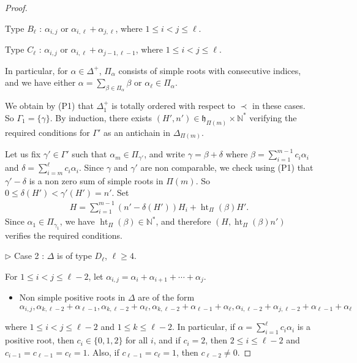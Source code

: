 \documentclass{amsart}
\theoremstyle{definition}
\theoremstyle{remark}
\numberwithin{equation}{section}
\newcommand{\height}{\mathop{\mathrm{ht}}\nolimits}
\begin{document}
\begin{proof}
\begin{itemize}
Type $B_{\ell}$ : $\alpha_{i,j}$ or $\alpha_{i,\ell} + \alpha_{j,\ell}$, where 
$1 \leqslant i < j \leqslant \ell$.

Type $C_{\ell}$ : $\alpha_{i,j}$ or $\alpha_{i,\ell} + \alpha_{j-1,\ell-1}$,
where $1 \leqslant i < j \leqslant \ell$.

\noindent In particular, for $\alpha\in\Delta^{+}$, $\Pi_{\alpha}$ consists of simple roots with 
consecutive indices, and we have either
$\alpha = \sum_{\beta\in \Pi_{\alpha}} \beta$ or 
$\alpha_{\ell} \in \Pi_{\alpha}$.
\end{itemize}

We obtain by (P1) that $\Delta_{1}^{+}$ is totally ordered with respect to $\prec$ in these cases.
So $\Gamma_{1} = \{ \gamma \}$. 
By induction, there exists $( H' , n' ) \in\mathfrak{h}_{\Pi (m)} \times \mathbb{N}^{*}$ 
verifying the required conditions for $\Gamma'$ as an antichain in $\Delta_{\Pi (m) }$.

Let us fix $\gamma'\in \Gamma'$ such that $\alpha_{m}\in\Pi_{\gamma'}$, and
write $\gamma = \beta + \delta$ where 
$\beta = \sum_{i=1}^{m-1} c_{i}\alpha_{i}$ and 
$\delta = \sum_{i=m}^{\ell} c_{i}\alpha_{i}$.
Since $\gamma$ and $\gamma'$ are non comparable, we check using (P1)
that $\gamma' - \delta$ is a non zero sum of simple roots in $\Pi (m)$. So
$0 \leqslant  \delta (H')  < \gamma'  (H') = n'$. 
Set 
$$\begin{array}{c}
H = \sum\limits_{i=1}^{m-1} (n' - \delta( H') ) H_{i} + \height_{\Pi} (\beta) H'.
\end{array}$$
Since $\alpha_{1}\in \Pi_{\gamma_{1}}$, we have $\height_{\Pi} (\beta ) \in \mathbb{N}^{*}$,
and therefore $(H , \height_{\Pi}(\beta ) n' )$ verifies the required conditions.
\smallskip

\noindent$\triangleright$ Case 2 : $\Delta$ is of type $D_{\ell}$, $\ell \geqslant 4$.
\smallskip

For $1\leqslant i < j \leqslant \ell-2$, let 
$\alpha_{i,j} = \alpha_{i} + \alpha_{i+1} + \cdots + \alpha_{j}$.

\begin{itemize}
\item[(P2)] 
Non simple positive roots in $\Delta$ are of the form 
$$
\alpha_{i,j}, \alpha_{k,\ell-2} + \alpha_{\ell-1},  \alpha_{k,\ell-2} + \alpha_{\ell},
\alpha_{k,\ell-2} + \alpha_{\ell-1} + \alpha_{\ell}, \alpha_{i,\ell-2} + \alpha_{j,\ell -2} + 
\alpha_{\ell-1} + \alpha_{\ell} 
$$
\end{itemize}
\noindent where $1\leqslant i < j \leqslant \ell-2$ and $1\leqslant k \leqslant \ell-2$. In particular, if
$\alpha = \sum_{i=1}^{\ell} c_{i} \alpha_{i}$ is a positive root, then 
$c_{i} \in \{ 0, 1,2 \}$ for all $i$, and if $c_{i} = 2$, then $2\leqslant i\leqslant \ell-2$ and
$c_{i-1} = c_{\ell-1} = c_{\ell} = 1$. Also, if $c_{\ell-1} = c_{\ell} = 1$, then $c_{\ell-2}\neq 0$.
\smallskip


\end{proof}
\end{document}
